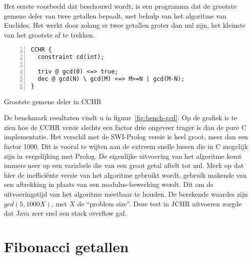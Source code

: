 Het eerste voorbeeld dat beschouwd wordt, is een programma dat de grootste gemene deler van twee getallen bepaalt, met behulp van het algoritme van Euclides. Het werkt door zolang er twee getallen groter dan nul zijn, het kleinste van het grootste af te trekken. 
\begin{exCode}
\begin{Verbatim}[frame=single,numbers=left]
CCHR {
  constraint cd(int);

  triv @ gcd(0) <=> true;
  dec @ gcd(N) \ gcd(M) <=> M>=N | gcd(M-N);
}
\end{Verbatim}
\caption{\label{code:gcd} Grootste gemene deler in CCHR}
\end{exCode}
De benchmark resultaten vindt u in figuur~\ref{fig:bench-gcd}. Op de grafiek is te zien hoe de CCHR versie slechts een factor drie ongeveer trager is dan de pure C implementatie. Het verschil met de SWI-Prolog versie is heel groot, meer dan een factor 1000. Dit is vooral te wijten aan de extreem snelle lussen die in C mogelijk zijn in vergelijking met Prolog. De eigenlijke uitvoering van het algoritme komt immers neer op een variabele die van een groot getal aftelt tot nul. Merk op dat hier de ineffici\"ente versie van het algoritme gebruikt wordt, gebruik makende van een aftrekking in plaats van een modulus-bewerking wordt. Dit om de uitvoeringstijd van het algoritme meetbaar te houden. De berekende waardes zijn $gcd(5,1000 X)$, met $X$ de ``problem size''. Deze test in JCHR uitvoeren zorgde dat Java zeer snel een stack overflow gaf.

\section{Fibonacci getallen} \label{sec:bench-fib}

